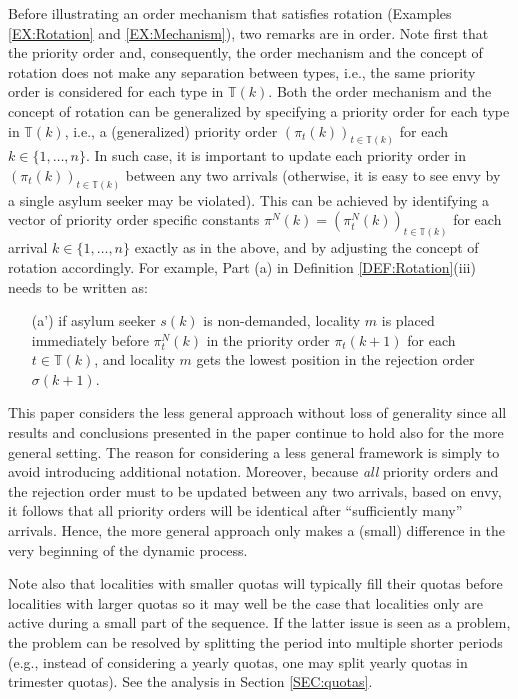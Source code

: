 \documentclass[12pt,fleqn]{article}
\begin{document}
\noindent Before illustrating an order mechanism that satisfies rotation (Examples \ref{EX:Rotation} and \ref{EX:Mechanism}), two remarks are in order. Note first that the priority order and, consequently, the order mechanism and the concept of rotation does not make any separation between types, i.e., the same priority order is considered for each type in $\mathbb{T}(k)$. Both the order mechanism and the concept of rotation can be generalized by specifying a priority order for each type in $\mathbb{T}(k)$, i.e., a (generalized) priority order $(\pi_t(k))_{t\in \mathbb{T}(k)}$ for each $k\in\{1,\ldots,n\}$. In such case, it is important to update each priority order in $(\pi_t(k))_{t\in \mathbb{T}(k)}$ between any two arrivals (otherwise, it is easy to see envy by a single asylum seeker may be violated). This can be achieved by identifying a vector of priority order specific constants $\pi^N(k)=(\pi_t^N(k))_{t\in \mathbb{T}(k)}$ for each arrival $k\in\{1,\ldots,n\}$ exactly as in the above, and by adjusting the concept of rotation accordingly. For example, Part (a) in Definition \ref{DEF:Rotation}(iii) needs to be written as:
\begin{enumerate}
\item[(a')] if asylum seeker $s(k)$ is non-demanded, locality $m$ is placed immediately before $\pi_t^N(k)$ in the priority order $\pi_t(k+1)$ for each $t\in \mathbb{T}(k)$, and locality $m$ gets the lowest position in the rejection order $\sigma(k+1)$.
\end{enumerate}
\noindent This paper considers the less general approach without loss of generality since all results and conclusions presented in the paper continue to hold also for the more general setting. The reason for considering a less general framework is simply to avoid introducing additional notation. Moreover, because \emph{all} priority orders and the rejection order must to be updated between any two arrivals, based on envy, it follows that all priority orders will be identical after ``sufficiently many'' arrivals. Hence, the more general approach only makes a (small) difference in the very beginning of the dynamic process.

Note also that localities with smaller quotas will typically fill their quotas before localities with larger quotas so it may well be the case that localities only are active during a small part of the sequence. If the latter issue is seen as a problem, the problem can be resolved by splitting the period into multiple shorter periods (e.g., instead of considering a yearly quotas, one may split yearly quotas in trimester quotas). See the analysis in Section \ref{SEC:quotas}.
\end{document}
